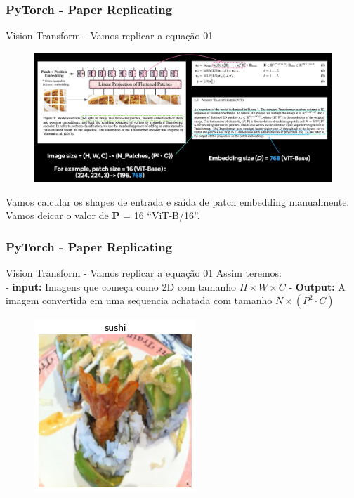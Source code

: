 \documentclass{beamer}
\begin{document}
\begin{frame}
	\frametitle{PyTorch - Paper Replicating}
	\begin{block}{Vision Transform - Vamos replicar a equação 01}
		\begin{figure}
			\centering
			\includegraphics[width=1\linewidth]{figures/vit_fig1_eqs1}
		\end{figure}
	Vamos calcular os shapes de entrada e saída de patch embedding manualmente. Vamos deicar o valor de \textbf{P} = 16 ``ViT-B/16''.
	\end{block}
	
\end{frame}
\begin{frame}
	\frametitle{PyTorch - Paper Replicating}
	\begin{block}{Vision Transform - Vamos replicar a equação 01}
		Assim teremos: \\
		- \textbf{input:} Imagens que começa como 2D com tamanho  ${H \times W \times C}$
		- \textbf{Output:} A imagem convertida em uma sequencia achatada com tamanho ${N \times\left(P^{2} \cdot C\right)}$
		\begin{figure}
			\centering
			\includegraphics[width=0.4\linewidth]{figures/vit_patch_ex00}
		\end{figure}
		
	\end{block}
	
\end{frame}
\end{document}
